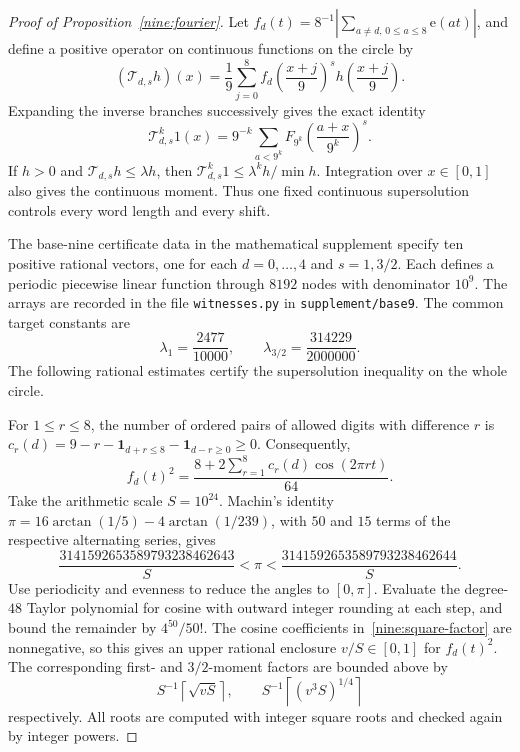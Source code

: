\documentclass[11pt,a4paper]{article}
\theoremstyle{paperplain}
\numberwithin{equation}{section}
\begin{document}
\begin{proof}[Proof of Proposition~\ref{nine:fourier}]
Let
$f_d(t)=8^{-1}|\sum_{a\ne d,\,0\le a\le8}\mathrm e(at)|$,
and define a positive operator on continuous functions on the circle by
\[
 (\mathcal T_{d,s}h)(x)=\frac19\sum_{j=0}^8
 f_d\left(\frac{x+j}{9}\right)^s h\left(\frac{x+j}{9}\right).
\]
Expanding the inverse branches successively gives the exact identity
\begin{equation}\label{nine:transfer}
 \mathcal T_{d,s}^k1(x)=9^{-k}
 \sum_{a<9^k}F_{9^k}\left(\frac{a+x}{9^k}\right)^s.
\end{equation}
If $h>0$ and $\mathcal T_{d,s}h\le\lambda h$, then
$\mathcal T_{d,s}^k1\le\lambda^kh/\min h$.
Integration over $x\in[0,1]$ also gives the continuous moment.
Thus one fixed continuous supersolution controls every word length and every shift.

The base-nine certificate data in the mathematical supplement specify
ten positive rational vectors, one for each $d=0,\ldots,4$ and
$s=1,3/2$. Each defines a periodic piecewise linear function through
$8192$ nodes with denominator $10^9$.
The arrays are recorded in the file \texttt{witnesses.py}
in \texttt{supplement/base9}.
The common target constants are
\begin{equation}\label{nine:lambdas}
 \lambda_1=\frac{2477}{10000},\qquad
 \lambda_{3/2}=\frac{314229}{2000000}.
\end{equation}
The following rational estimates certify the supersolution inequality
on the whole circle.

For $1\le r\le8$, the number of ordered pairs of allowed digits with difference $r$ is
$c_r(d)=9-r-\mathbf1_{d+r\le8}-\mathbf1_{d-r\ge0}\ge0$.
Consequently,
\begin{equation}\label{nine:square-factor}
 f_d(t)^2=\frac{8+2\sum_{r=1}^8c_r(d)\cos(2\pi rt)}{64}.
\end{equation}
Take the arithmetic scale $S=10^{24}$.
Machin's identity
$\pi=16\arctan(1/5)-4\arctan(1/239)$,
with $50$ and $15$ terms of the respective alternating series, gives
\[
 \frac{3141592653589793238462643}{S}<\pi<
 \frac{3141592653589793238462644}{S}.
\]
Use periodicity and evenness to reduce the angles to $[0,\pi]$.
Evaluate the degree-$48$ Taylor polynomial for cosine with outward integer
rounding at each step, and bound the remainder by $4^{50}/50!$.
The cosine coefficients in~\eqref{nine:square-factor} are nonnegative,
so this gives an upper rational enclosure $v/S\in[0,1]$ for $f_d(t)^2$.
The corresponding first- and $3/2$-moment factors are bounded above by
\[
 S^{-1}\left\lceil\sqrt{vS}\right\rceil,\qquad
 S^{-1}\left\lceil(v^3S)^{1/4}\right\rceil
\]
respectively. All roots are computed with integer square roots and checked
again by integer powers.


\end{proof}
\end{document}
